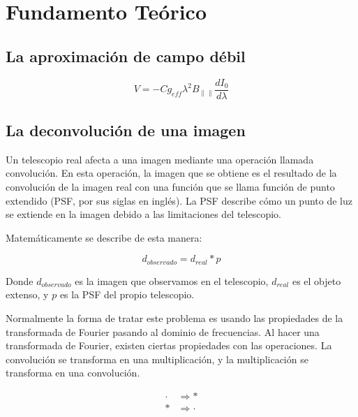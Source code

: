 
\section{Fundamento Teórico}

\subsection{La aproximación de campo débil}

\begin{equation}
    \label{eq:campoDebil}
    V = -C g_{eff} \lambda^2 B_{\| \|} \frac{d I_0}{d \lambda}
\end{equation}


\subsection{La deconvolución de una imagen}

Un telescopio real afecta a una imagen mediante una operación llamada convolución. En esta operación, la imagen que se obtiene es el resultado de la convolución de la imagen real con una función que se llama función de punto extendido (PSF, por sus siglas en inglés). La PSF describe cómo un punto de luz se extiende en la imagen debido a las limitaciones del telescopio.

Matemáticamente se describe de esta manera:

\begin{equation}
    \label{eq:convolucion}
    d_{observado} = d_{real} * p
\end{equation}

Donde $d_{observado}$ es la imagen que observamos en el telescopio, $d_{real}$ es el objeto extenso, y $p$ es la PSF del propio telescopio.

Normalmente la forma de tratar este problema es usando las propiedades de la transformada de Fourier pasando al dominio de frecuencias. Al hacer una transformada de Fourier, existen ciertas propiedades con las operaciones. La convolución se transforma en una multiplicación, y la multiplicación se transforma en una convolución.

\begin{equation}
    \label{eq:propFurier}
    \begin{split}
        \cdot &\Longrightarrow * \\
        * &\Longrightarrow \cdot
    \end{split}
\end{equation}


